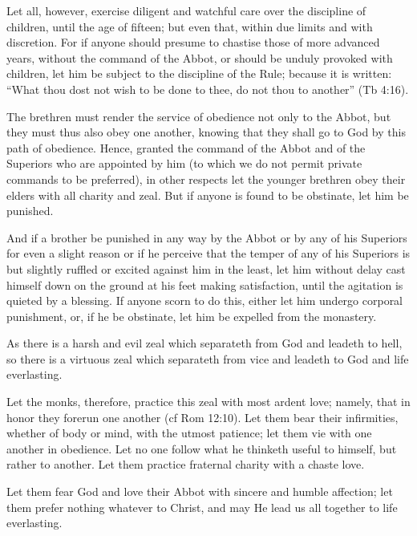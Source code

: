 Let all, however, exercise diligent and watchful care over the discipline of children, until the age of fifteen; but even that, within due limits and with discretion. For if anyone should presume to chastise those of more advanced years, without the command of the Abbot, or should be unduly provoked with children, let him be subject to the discipline of the Rule; because it is written: ``What thou dost not wish to be done to thee, do not thou to another'' (Tb 4:16).


The brethren must render the service of obedience not only to the Abbot, but they must thus also obey one another, knowing that they shall go to God by this path of obedience. Hence, granted the command of the Abbot and of the Superiors who are appointed by him (to which we do not permit private commands to be preferred), in other respects let the younger brethren obey their elders with all charity and zeal. But if anyone is found to be obstinate, let him be punished.

And if a brother be punished in any way by the Abbot or by any of his Superiors for even a slight reason or if he perceive that the temper of any of his Superiors is but slightly ruffled or excited against him in the least, let him without delay cast himself down on the ground at his feet making satisfaction, until the agitation is quieted by a blessing. If anyone scorn to do this, either let him undergo corporal punishment, or, if he be obstinate, let him be expelled from the monastery.


As there is a harsh and evil zeal which separateth from God and leadeth to hell, so there is a virtuous zeal which separateth from vice and leadeth to God and life everlasting.

Let the monks, therefore, practice this zeal with most ardent love; namely, that in honor they forerun one another (cf Rom 12:10). Let them bear their infirmities, whether of body or mind, with the utmost patience; let them vie with one another in obedience. Let no one follow what he thinketh useful to himself, but rather to another. Let them practice fraternal charity with a chaste love.

Let them fear God and love their Abbot with sincere and humble affection; let them prefer nothing whatever to Christ, and may He lead us all together to life everlasting.

